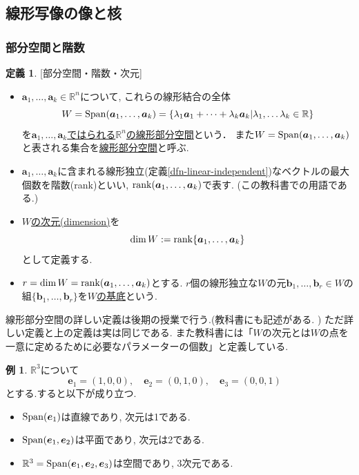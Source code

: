 \documentclass[dvipdfmx,a4paper,11pt]{article}
\newcommand{\R}{\mathbb{R}}
\theoremstyle{definition}
\newtheorem{dfn}[thm]{定義}
\newtheorem{exa}[thm]{例}
\begin{document}
\subsection{線形写像の像と核\cite[2.7節]{M}}
\subsubsection{部分空間と階数}

\begin{tcolorbox}[
    colback = white,
    colframe = green!35!black,
    fonttitle = \bfseries,
    breakable = true]
    \begin{dfn}\cite[定義2.4]{M}[部分空間・階数・次元]
     \begin{itemize}
   \setlength{\parskip}{0cm} 
  \setlength{\itemsep}{0cm}
    \item $\bm{a}_1, \ldots, \bm{a}_k \in \R^n$について, これらの線形結合の全体
    $$
    W = {\rm Span}(\bm{a}_1, \ldots, \bm{a}_k)=
    \{ \lambda_1\bm{a}_1 + \cdots +\lambda_k \bm{a}_k | \lambda_1, \ldots \lambda_k \in\R \}
    $$
    を\underline{$\bm{a}_1, \ldots, \bm{a}_k$ではられる$\R^n$の線形部分空間}という．
    また$W={\rm Span}(\bm{a}_1, \ldots, \bm{a}_k)$と表される集合を\underline{線形部分空間}と呼ぶ.
    
    \item$\bm{a}_1, \ldots, \bm{a}_k$に含まれる線形独立(定義\ref{dfn-linear-independent})なベクトルの最大個数を階数(rank)といい, ${\rm rank}(\bm{a}_1, \ldots, \bm{a}_k)$で表す. (この教科書での用語である.)
    \item \underline{$W$の次元(dimension)}を
    $$
    \dim W :={\rm rank} \{ \bm{a}_1, \ldots, \bm{a}_k\}
    $$
    として定義する.
    \item $r=\dim W = {\rm rank}(\bm{a}_1, \ldots, \bm{a}_k)$とする. $r$個の線形独立な$W$の元$\bm{b}_1, \ldots, \bm{b}_r \in W$の組$\{\bm{b}_1, \ldots, \bm{b}_r\}$を\underline{$W$の基底}という.
    \end{itemize}
  \end{dfn}
  \end{tcolorbox}
  線形部分空間の詳しい定義は後期の授業で行う.(教科書\cite[定義2.4']{M}にも記述がある. ) ただ詳しい定義と上の定義は実は同じである.
 また教科書には「$W$の次元とは$W$の点を一意に定めるために必要なパラメーターの個数」と定義している. 
 \begin{exa}
 $\R^3$について
$$
\bm{e}_1=(1,0,0), \quad
\bm{e}_2=(0,1,0), \quad
\bm{e}_3=(0,0,1) \quad
 $$
 とする.すると以下が成り立つ.
 \begin{itemize}
    \setlength{\parskip}{0cm} 
  \setlength{\itemsep}{0cm}
\item  ${\rm Span}(\bm{e}_1)$は直線であり, 次元は1である.
\item ${\rm Span}(\bm{e}_1, \bm{e}_2)$は平面であり, 次元は2である.
\item $\R^3 = {\rm Span}(\bm{e}_1, \bm{e}_2, \bm{e}_3)$は空間であり, 3次元である. 
  \end{itemize}

 \end{exa}
\end{document}
